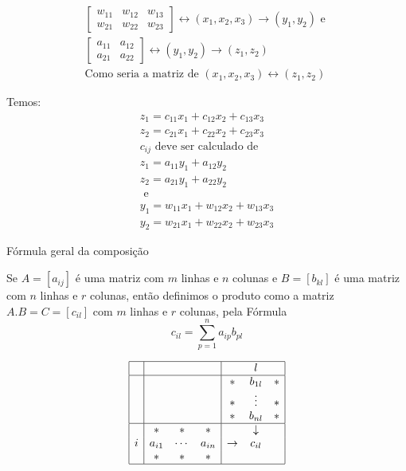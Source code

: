\documentclass{beamer}
\begin{document}
\begin{frame}{}
  \begin{gather*}
    \begin{bmatrix}
      w_{11} & w_{12} & w_{13} \\
      w_{21} & w_{22} & w_{23} 
    \end{bmatrix} \leftrightarrow (x_1, x_2, x_3) \to (y_1, y_2)
    \text{ e } \\ 
    \begin{bmatrix}
      a_{11} & a_{12} \\ a_{21} & a_{22}
    \end{bmatrix} \leftrightarrow (y_1, y_2) \to (z_1,z_2) \\
    \text{Como seria a matriz de }
    (x_1, x_2 , x_3) \leftrightarrow (z_1, z_2)
\end{gather*}

  
\end{frame}

\begin{frame}{}
  Temos:
  \begin{gather*}
    z_1 = c_{11}x_1 + c_{12}x_2 + c_{13}x_3 \\
    z_2 = c_{21}x_1 + c_{22}x_2 + c_{23}x_3 \\
     c_{ij}\text{ deve ser calculado de }\\
    z_1 = a_{11}y_1 + a_{12}y_2 \\
    z_2 = a_{21}y_1 + a_{22}y_2 \\
    \text{ e } \\
    y_1 = w_{11}x_1 + w_{12}x_2 + w_{13}x_3 \\
    y_2 = w_{21}x_1 + w_{22}x_2 + w_{23}x_3 
  \end{gather*}
  

\end{frame}

\begin{frame}{Fórmula geral da composição}

  Se $A= [a_{ij}]$ é uma matriz com $m$ linhas e $n$ colunas e
  $B = [b_{kl}]$ é uma matriz com $n$ linhas e $r$ colunas,
  então definimos o produto como a matriz $A.B=C =[c_{il}]$ com $m$ linhas e 
  $r$ colunas, pela Fórmula
  $$ c_{il} = \sum_{p=1}^{n}a_{ip}b_{pl} $$
  

  
\end{frame}


\begin{frame}{ }
 
  $$
\begin{array}{|c|ccc|ccc|} \hline
& & & &  & l &   \\ \hline
& & & & *& b_{1l} & * \\
& & & & * & \vdots & *  \\
& & & & * & b_{nl} & * \\ \hline  
& * & * & * &  & \downarrow & \\
i& a_{i1} & \cdots & a_{in} & \rightarrow & c_{il} & \\
 &* & * & * & & & \\ \hline 
\end{array}
  $$
\end{frame}
\end{document}
